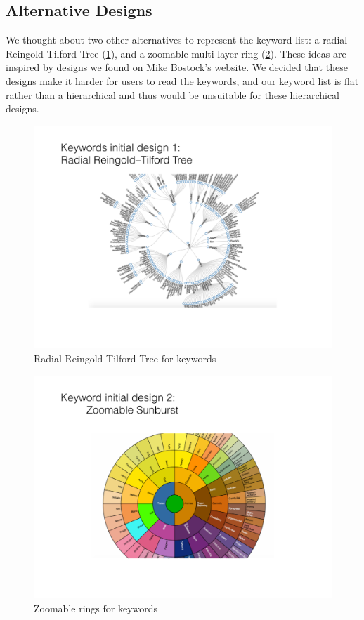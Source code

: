 \documentclass[dvips,12pt]{article}
\begin{document}
\subsection{Alternative Designs}

We thought about two other alternatives to represent the keyword list: a radial Reingold-Tilford Tree (\ref{fig:radial_tree}), and a zoomable multi-layer ring (\ref{fig:zoomable_ring}). These ideas are inspired by \href{http://bl.ocks.org/mbostock/4063550}{designs} we found on Mike Bostock's \href{http://bl.ocks.org/metmajer/5480307}{website}. We decided that these designs make it harder for users to read the keywords, and our keyword list is flat rather than a hierarchical and thus would be unsuitable for these hierarchical designs.

\begin{figure}[htb!]
    \centering
    \includegraphics[width=160mm]{visproposalDrawing_page_Part_9.pdf}
    \caption{Radial Reingold-Tilford Tree for keywords}
    \label{fig:radial_tree}
\end{figure}

\begin{figure}[htb!]
    \centering
    \includegraphics[width=160mm]{visproposalDrawing_page_Part_10.pdf}
    \caption{Zoomable rings for keywords}
    \label{fig:zoomable_ring}
\end{figure}
\end{document}
